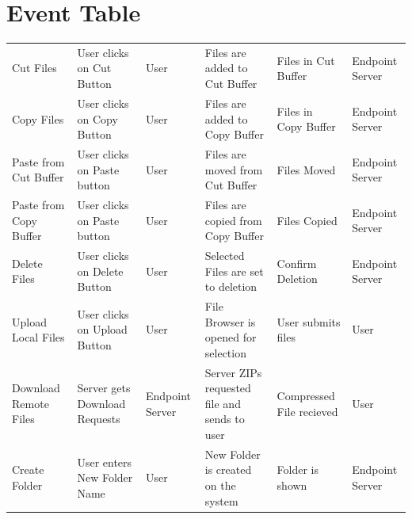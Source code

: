 \documentclass[12pt]{article}
\newenvironment{changemargin}[2]{%
\begin{list}{}{%
\setlength{\topsep}{0pt}%
\setlength{\leftmargin}{#1}%
\setlength{\rightmargin}{#2}%
\setlength{\listparindent}{\parindent}%
\setlength{\itemindent}{\parindent}%
\setlength{\parsep}{\parskip}%
}%
\item[]}{\end{list}}
\begin{document}
\section{Event Table}
\begin{changemargin}{-1cm}{-1cm}
\vfill
\begin{center}
\begin{tabular}{ | C{2cm} | C{3cm} | C{2cm} | C{3cm} | C{3cm} | C{2cm} | }
	\hline
	 &
	 &
	 &
	 &
	 &
	 \\
	\hline\hline
	Cut Files &
	User clicks on Cut Button & User &
	Files are added to Cut Buffer &
	Files in Cut Buffer &
	Endpoint Server \\ \hline

	Copy Files & User clicks on Copy Button & User &
	Files are added to Copy Buffer &
	Files in Copy Buffer &
	Endpoint Server \\ \hline

	Paste from Cut Buffer &
	User clicks on Paste button &
	User &
	Files are moved from Cut Buffer &
	Files Moved &
	Endpoint Server \\ \hline

	Paste from Copy Buffer &
	User clicks on Paste button &
	User &
	Files are copied from Copy Buffer &
	Files Copied &
	Endpoint Server \\ \hline

	Delete Files &
	User clicks on Delete Button &
	User &
	Selected Files are set to deletion &
	Confirm Deletion &
	Endpoint Server \\ \hline

	Upload Local Files &
	User clicks on Upload Button &
	User &
	File Browser is opened for selection &
	User submits files &
	User \\ \hline

	Download Remote Files &
	Server gets Download Requests &
	Endpoint Server &
	Server ZIPs requested file and sends to user &
	Compressed File recieved &
	User \\ \hline

	Create Folder &
	User enters New Folder Name &
	User &
	New Folder is created on the system &
	Folder is shown &
	Endpoint Server \\ \hline

\end{tabular}
\end{center}
\vfill
\end{changemargin}
\end{document}
